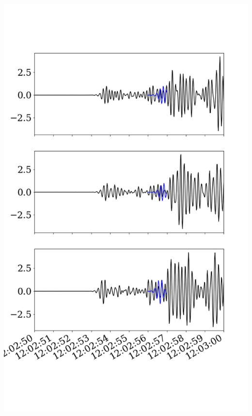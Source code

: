 \documentclass{beamer}
\begin{document}
\begin{frame}
\begin{minipage}{0.4\linewidth}
    \includegraphics[width=1.2\linewidth]{images/fig_6.png}
 \end{minipage}
 
\end{frame}
\end{document}
